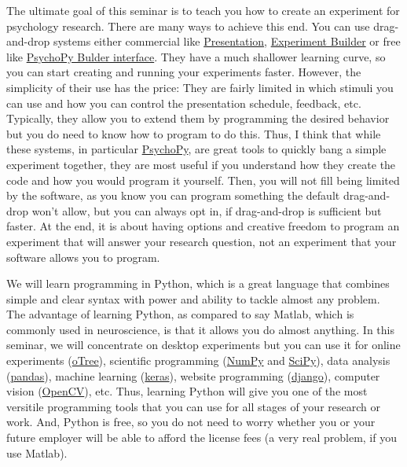 \documentclass[
]{book}
\begin{document}
The ultimate goal of this seminar is to teach you how to create an experiment for psychology research. There are many ways to achieve this end. You can use drag-and-drop systems either commercial like \href{https://www.neurobs.com/}{Presentation}, \href{https://www.sr-research.com/experiment-builder/}{Experiment Builder} or free like \href{https://psychopy.org/builder}{PsychoPy Bulder interface}. They have a much shallower learning curve, so you can start creating and running your experiments faster. However, the simplicity of their use has the price: They are fairly limited in which stimuli you can use and how you can control the presentation schedule, feedback, etc. Typically, they allow you to extend them by programming the desired behavior but you do need to know how to program to do this. Thus, I think that while these systems, in particular \href{https://psychopy.org/}{PsychoPy}, are great tools to quickly bang a simple experiment together, they are most useful if you understand how they create the code and how you would program it yourself. Then, you will not fill being limited by the software, as you know you can program something the default drag-and-drop won't allow, but you can always opt in, if drag-and-drop is sufficient but faster. At the end, it is about having options and creative freedom to program an experiment that will answer your research question, not an experiment that your software allows you to program.

We will learn programming in Python, which is a great language that combines simple and clear syntax with power and ability to tackle almost any problem. The advantage of learning Python, as compared to say Matlab, which is commonly used in neuroscience, is that it allows you do almost anything. In this seminar, we will concentrate on desktop experiments but you can use it for online experiments (\href{https://otree.readthedocs.io/en/latest/}{oTree}), scientific programming (\href{https://numpy.org/}{NumPy} and \href{https://www.scipy.org/}{SciPy}), data analysis (\href{https://pandas.pydata.org/}{pandas}), machine learning (\href{https://keras.io/}{keras}), website programming (\href{https://www.djangoproject.com/}{django}), computer vision (\href{https://opencv.org/}{OpenCV}), etc. Thus, learning Python will give you one of the most versitile programming tools that you can use for all stages of your research or work. And, Python is free, so you do not need to worry whether you or your future employer will be able to afford the license fees (a very real problem, if you use Matlab).
\end{document}

